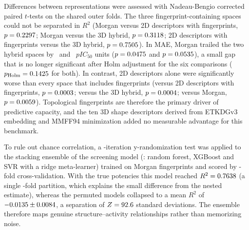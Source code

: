 Differences between representations were assessed with Nadeau-Bengio corrected paired $t$-tests on the shared outer folds. The three fingerprint-containing spaces could not be separated in $R^2$ (Morgan versus 2D descriptors with fingerprints, $p = 0.2297$; Morgan versus the 3D hybrid, $p = 0.3118$; 2D descriptors with fingerprints versus the 3D hybrid, $p = 0.7505$). In MAE, Morgan trailed the two hybrid spaces by \NBdiffMAEMorganVsTwoDFp\ and \NBdiffMAEMorganVsTwoDThreeDFp\ $pIC_{50}$ units ($p = 0.0475$ and $p = 0.0535$), a small gap that is no longer significant after Holm adjustment for the six comparisons ($p_{\mathrm{Holm}} = 0.1425$ for both). In contrast, 2D descriptors alone were significantly worse than every space that includes fingerprints (versus 2D descriptors with fingerprints, $p = 0.0003$; versus the 3D hybrid, $p = 0.0004$; versus Morgan, $p = 0.0059$). Topological fingerprints are therefore the primary driver of predictive capacity, and the ten 3D shape descriptors derived from ETKDGv3 embedding and MMFF94 minimization added no measurable advantage for this benchmark.

To rule out chance correlation, a \YRandomNPermutations-iteration y-randomization test was applied to the stacking ensemble of the screening model (\YRandomArchitecture: random forest, XGBoost and SVR with a ridge meta-learner) trained on Morgan fingerprints and scored by \YRandomCVFolds-fold cross-validation. With the true potencies this model reached $R^2 = 0.7638$ (a single \YRandomCVFolds-fold partition, which explains the small difference from the nested estimate), whereas the permuted models collapsed to a mean $R^2$ of $-0.0135 \pm 0.0084$, a separation of $Z = 92.6$ standard deviations. The ensemble therefore maps genuine structure--activity relationships rather than memorizing noise.

